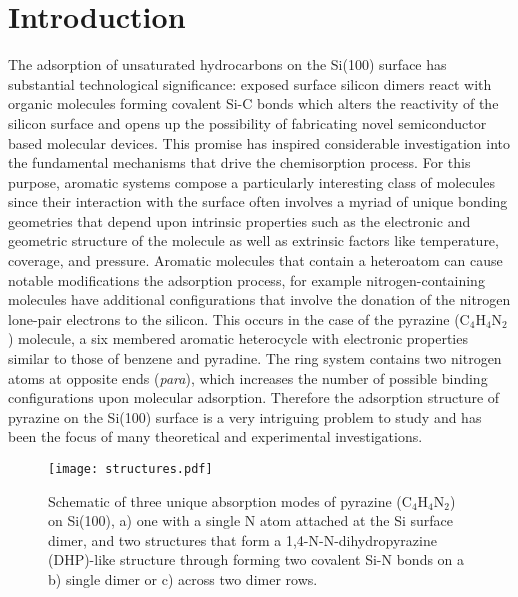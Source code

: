 \documentclass{article}
\begin{document}
\section{Introduction}
The adsorption of unsaturated hydrocarbons on the Si(100) surface has substantial technological significance: \cite{tao_electronic_2009,bent_organic_2002,filler_surface_2003} exposed surface silicon dimers react with organic molecules forming covalent Si-C bonds which alters the reactivity of the silicon surface and opens up the possibility of fabricating novel semiconductor based molecular devices. \cite{wolkow_controlled_1999,karthauser_control_2011,mentovich_multipeak_2008,joachim_electronics_2000} This promise has inspired considerable investigation into the fundamental mechanisms that drive the chemisorption process. \cite{mayne_chemisorbed_2004,lu_diradical_2003,taguchi_adsorbed_1991,sinniah_new_1989,zhao_temperature-programmed_2017,akagi_chemistry_2016} For this purpose, aromatic systems compose a particularly interesting class of molecules since their interaction with the surface often involves a myriad of unique bonding geometries that depend upon intrinsic properties such as the electronic and geometric structure of the molecule \cite{konecny_cycloaddition_1998,lu_chemisorption_2002,qu_theoretical_2004} as well as extrinsic factors like temperature, coverage, and pressure. \cite{tao_formation_2002,kong_nexafs_1998,wang_reactions_2003} Aromatic molecules that contain a heteroatom can cause notable modifications the adsorption process, for example nitrogen-containing molecules have additional configurations that involve the donation of the nitrogen lone-pair electrons to the silicon. \cite{romeo_n1s_2014,tao_dative_2003,miwa_selective_2005,weier_local_2011,ardalan_reactions_2011,chatterjee_self-directed_2013} This occurs in the case of the pyrazine (C$_4$H$_4$N$_2$) molecule, a six membered aromatic heterocycle with electronic properties similar to those of benzene and pyradine. The ring system contains two nitrogen atoms at opposite ends (\textit{para}), which increases the number of possible binding configurations upon molecular adsorption. \cite{lu_chemisorption_2002} Therefore the adsorption structure of pyrazine on the Si(100) surface is a very intriguing problem to study and has been the focus of many theoretical and experimental investigations. \cite{lu_chemisorption_2002,jung_adsorption_2009,huang_selective_2004,lee_selective_2012,lu_reactions_2002,ng_mechanism_2013,omiya_well-oriented_2012,shimomura_behaviour_2013}

\begin{figure}[b!]
\centering
\texttt{[image: structures.pdf]}
\caption{Schematic of three unique absorption modes of pyrazine (C$_4$H$_4$N$_2$) on Si(100), a) one with a single N atom attached at the Si surface dimer, and two structures that form a 1,4-N-N-dihydropyrazine (DHP)-like structure through forming two covalent Si-N bonds on a b) single dimer or c) across two dimer rows.}
\label{fig:structures}
\end{figure}
\end{document}
